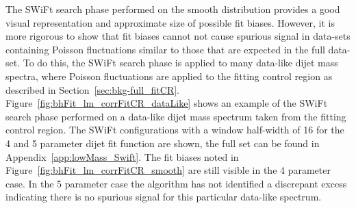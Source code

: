 The SWiFt search phase performed on the smooth distribution provides a good visual representation and approximate size of possible fit biases.
However, it is more rigorous to show that fit biases cannot not cause spurious signal in data-sets containing
Poisson fluctuations similar to those that are expected in the full \lm{} data-set.
To do this, the SWiFt search phase is applied to many data-like dijet mass spectra,
where Poisson fluctuations are applied to the fitting control region as described in Section~\ref{sec:bkg-full_fitCR}.
Figure~\ref{fig:bhFit_lm_corrFitCR_dataLike} shows an example of the SWiFt search phase performed on a data-like dijet mass spectrum taken from the fitting control region.
The SWiFt configurations with a window half-width of 16 for the 4 and 5 parameter dijet fit function are shown, the full set can be found in Appendix~\ref{app:lowMass_Swift}.
The fit biases noted in Figure~\ref{fig:bhFit_lm_corrFitCR_smooth} are still visible in the 4 parameter case.
In the 5 parameter case the \bh{} algorithm has not identified a discrepant excess indicating
there is no spurious signal for this particular data-like spectrum.

